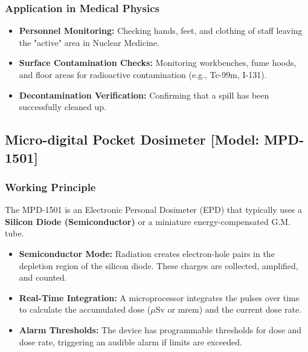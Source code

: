 \subsubsection{Application in Medical Physics}
\begin{itemize}
    \item \textbf{Personnel Monitoring:} Checking hands, feet, and clothing of staff leaving the "active" area in Nuclear Medicine.
    \item \textbf{Surface Contamination Checks:} Monitoring workbenches, fume hoods, and floor areas for radioactive contamination (e.g., Tc-99m, I-131).
    \item \textbf{Decontamination Verification:} Confirming that a spill has been successfully cleaned up.
\end{itemize}



\subsection{Micro-digital Pocket Dosimeter [Model: MPD-1501]}

\subsubsection{Working Principle}
The MPD-1501 is an Electronic Personal Dosimeter (EPD) that typically uses a \textbf{Silicon Diode (Semiconductor)} or a miniature energy-compensated G.M. tube.
\begin{itemize}
    \item \textbf{Semiconductor Mode:} Radiation creates electron-hole pairs in the depletion region of the silicon diode. These charges are collected, amplified, and counted.
    \item \textbf{Real-Time Integration:} A microprocessor integrates the pulses over time to calculate the accumulated dose ($\mu$Sv or mrem) and the current dose rate.
    \item \textbf{Alarm Thresholds:} The device has programmable thresholds for dose and dose rate, triggering an audible alarm if limits are exceeded.
\end{itemize}

